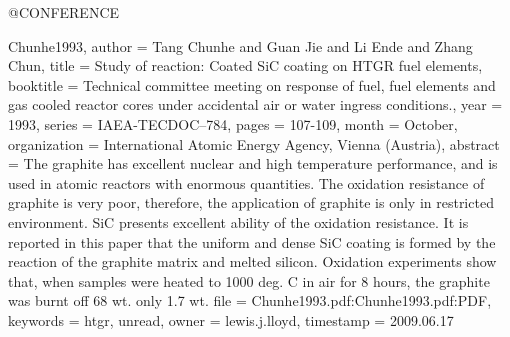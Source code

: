 @CONFERENCE{Chunhe1993,
  author = {Tang Chunhe and Guan Jie and Li Ende and Zhang Chun},
  title = {Study of reaction: Coated SiC coating on HTGR fuel elements},
  booktitle = {Technical committee meeting on response of fuel, fuel elements and
	gas cooled reactor cores under accidental air or water ingress conditions.},
  year = {1993},
  series = {IAEA-TECDOC--784},
  pages = {107-109},
  month = {October},
  organization = {International Atomic Energy Agency, Vienna (Austria)},
  abstract = {The graphite has excellent nuclear and high temperature performance,
	and is used in atomic reactors with enormous quantities. The oxidation
	resistance of graphite is very poor, therefore, the application of
	graphite is only in restricted environment. SiC presents excellent
	ability of the oxidation resistance. It is reported in this paper
	that the uniform and dense SiC coating is formed by the reaction
	of the graphite matrix and melted silicon. Oxidation experiments
	show that, when samples were heated to 1000 deg. C in air for 8 hours,
	the graphite was burnt off 68 wt. %
	only 1.7 wt.%
  file = {Chunhe1993.pdf:Chunhe1993.pdf:PDF},
  keywords = {htgr, unread},
  owner = {lewis.j.lloyd},
  timestamp = {2009.06.17}
}

}
